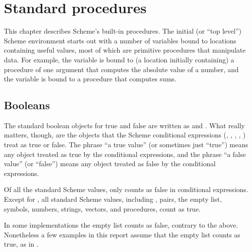 
\chapter{Standard procedures}
\label{initialenv}
\label{builtinchapter}


This chapter describes Scheme's built-in procedures.  The initial (or
``top level'') Scheme environment starts out with a number of variables
bound to locations containing useful values, most of which are primitive
procedures that manipulate data.  For example, the variable  is
bound to (a location initially containing) a procedure of one argument
that computes the absolute value of a number, and the variable \ide{+}
is bound to a procedure that computes sums.


\section{Booleans}
\label{booleansection}

The standard boolean objects for true and false are written as
\schtrue{} and \schfalse.  What really
matters, though, are the objects that the Scheme conditional expressions
(, , , , ) treat as
true or false.  The phrase ``a true value''
(or sometimes just ``true'') means any object treated as true by the
conditional expressions, and the phrase ``a false value'' (or
``false'') means any object treated as false by the conditional expressions.

\vest Of all the standard Scheme values, only \schfalse{}
counts as false in conditional expressions.
Except for \schfalse{},
all standard Scheme values, including \schtrue,
pairs, the empty list, symbols, numbers, strings, vectors, and procedures,
count as true.

\begin{note}
In some implementations the empty list counts as false, contrary
to the above.
Nonetheless a few examples in this report assume that the
empty list counts as true, as in \cite{IEEEScheme}.
\end{note}

